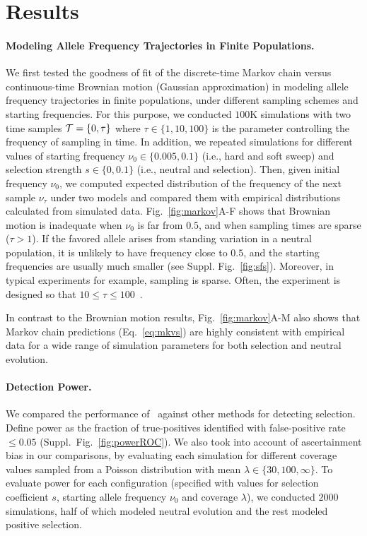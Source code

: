 \section{Results}
\paragraph{Modeling Allele Frequency Trajectories in Finite Populations.} 
We first tested the goodness of fit of the discrete-time Markov chain
versus continuous-time Brownian motion (Gaussian approximation) in modeling 
allele frequency
trajectories in finite populations, under different sampling schemes
and starting frequencies.  For this purpose, we conducted $100$K
simulations with two time samples ${\cal T}=\{0,\tau\}$ where $\tau\in
\{1,10,100\}$ is the parameter controlling the frequency of sampling
in time.  In addition, we repeated simulations for different values of
starting frequency $\nu_0\in\{0.005,0.1\}$ (i.e., hard and soft sweep)
and selection strength $s\in\{0,0.1\}$ (i.e., neutral and
selection). Then, given initial frequency $\nu_0$, we computed
expected distribution of the frequency of the next sample $\nu_\tau$
under two models and compared them with empirical distributions
calculated from simulated data.  Fig.~\ref{fig:markov}A-F shows that
Brownian motion is inadequate when $\nu_0$ is
far from $0.5$, and when sampling times are sparse ($\tau>1$). If the
favored allele arises from standing variation in a neutral population,
it is unlikely to have frequency close to $0.5$, and the starting
frequencies are usually much smaller (see
Suppl. Fig.~\ref{fig:sfs}). Moreover, in typical \dmel experiments for
example, sampling is sparse. Often, the experiment is designed so that
$10\le\tau\le100$~\cite{kofler2013guide, orozco2012adaptation,
  zhou2011experimental}.

In contrast to the Brownian motion results, Fig.~\ref{fig:markov}A-M
also shows that Markov chain predictions (Eq.~\ref{eq:mkvs}) are
highly consistent with empirical data for a wide range of simulation
parameters for both selection and neutral evolution.

\paragraph{Detection Power.} 
We compared the performance of \comale\ against other methods for
detecting selection. Define power as the fraction of true-positives
identified with false-positive rate $\le 0.05$
(Suppl.~Fig.~\ref{fig:powerROC}). We also took into account of
ascertainment bias in our comparisons, by evaluating each simulation
for different coverage values sampled from a Poisson distribution with
mean $\lambda\in \{30,100,\infty\}$.  To evaluate power for each
configuration (specified with values for selection coefficient $s$,
starting allele frequency $\nu_0$ and coverage $\lambda$), we
conducted $2000$ simulations, half of which modeled neutral evolution
and the rest modeled positive selection.

